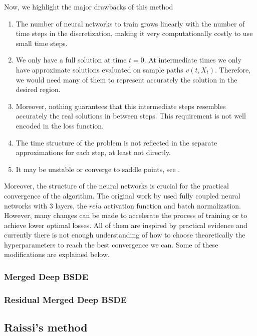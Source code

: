 Now, we highlight the major drawbacks of this method 
\begin{enumerate}
	\item The number of neural networks to train grows linearly with the number of time steps in the discretization, making it very computationally costly to use small time steps.
	\item We only have a full solution at time $t=0$. At intermediate times we only have approximate solutions evaluated on sample paths $v(t,X_t)$. Therefore, we would need many of them to represent accurately the solution in the desired region.
	\item Moreover, nothing guarantees that this intermediate steps resembles accurately the real solutions in between steps. This requirement is not well encoded in the loss function.
	\item The time structure of the problem is not reflected in the separate approximations for each step, at least not directly.
	\item It may be unstable or converge to saddle points, see \cite{hure_deep_2020}.
\end{enumerate}     

Moreover, the structure of the neural networks is crucial for the practical convergence of the algorithm. The original work by \cite{han_solving_2018} used fully coupled neural networks with 3 layers, the $relu$ activation function and batch normalization. However, many changes can be made to accelerate the process of training or to achieve lower optimal losses. All of them are inspired by practical evidence and currently there is not enough understanding of how to choose theoretically the hyperparameters to reach the best convergence we can. Some of these modifications are explained below.


\subsubsection*{Merged Deep BSDE}
\subsubsection*{Residual Merged Deep BSDE}

\subsection{Raissi's method}
